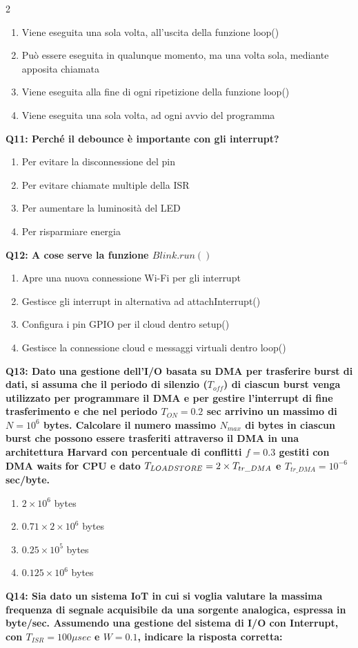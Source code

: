 \documentclass[10pt]{article}
\begin{document}
\begin{multicols}{2}
\begin{enumerate}[label=\arabic*.]
\item Viene eseguita una sola volta, all'uscita della funzione loop()
\item Può essere eseguita in qualunque momento, ma una volta sola, mediante apposita chiamata
\item Viene eseguita alla fine di ogni ripetizione della funzione loop()
\item Viene eseguita una sola volta, ad ogni avvio del programma
\end{enumerate}
\textbf{Q11: Perché il debounce è importante con gli interrupt?}

\begin{enumerate}[label=\arabic*.]
\item Per evitare la disconnessione del pin
\item Per evitare chiamate multiple della ISR
\item Per aumentare la luminosità del LED
\item Per risparmiare energia
\end{enumerate}
\textbf{Q12: A cose serve la funzione $Blink.run()$}

\begin{enumerate}[label=\arabic*.]
\item Apre una nuova connessione Wi-Fi per gli interrupt
\item Gestisce gli interrupt in alternativa ad attachInterrupt()
\item Configura i pin GPIO per il cloud dentro setup()
\item Gestisce la connessione cloud e messaggi virtuali dentro loop()
\end{enumerate}
\textbf{Q13: Dato una gestione dell’I/O basata su DMA per trasferire burst di dati, si assuma che il periodo di silenzio  ($T_{off}$) di ciascun burst venga utilizzato per programmare il DMA e per gestire l’interrupt di fine trasferimento e che nel periodo $T_{ON} = 0.2$ sec arrivino un massimo di $N=10^6$ bytes. Calcolare il numero massimo $N_{max}$ di bytes in ciascun burst che possono essere trasferiti attraverso il DMA in una architettura Harvard con percentuale di conflitti $f = 0.3$ gestiti con DMA waits for CPU e dato $T_{LOAD\/STORE} = 2 \times T_{tr\_DMA}$ e $T_{tr\_DMA} = 10^{-6}$ sec/byte.}

\begin{enumerate}[label=\arabic*.]
\item $2 \times 10^6$ bytes
\item $0.71 \times 2 \times 10^6$ bytes
\item $0.25 \times 10^5$ bytes
\item $0.125 \times 10^6$ bytes
\end{enumerate}
\textbf{Q14: Sia dato un sistema IoT in cui si voglia valutare la massima frequenza di segnale acquisibile da una sorgente analogica, espressa in byte/sec. Assumendo una gestione del sistema di I/O con Interrupt, con $T_{ISR}=100\mu sec$ e $W=0.1$, indicare la risposta corretta:}


\end{multicols}
\end{document}
